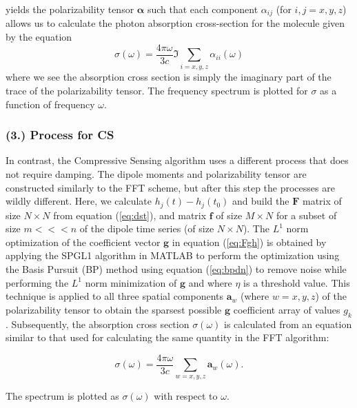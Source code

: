 \documentclass[11pt]{article}
\begin{document}
yields the polarizability tensor $\mathbf{\alpha}$ such that each component $\alpha_{ij}$ (for $i,j = x,y,z$) allows us to calculate the photon absorption cross-section for the molecule given by the equation
\begin{equation}\label{eq:fftcross}
	\sigma(\omega) = \frac{4 \pi \omega}{3c}  \Im\sum_{i = x, y, z} \alpha_{ii}(\omega)
\end{equation}
where we see the absorption cross section is simply the imaginary part of the trace of the polarizability tensor.  The frequency spectrum is plotted for $\sigma$ as a function of frequency $\omega$.

\subsubsection*{(3.)	Process for CS}	

\par In contrast, the Compressive Sensing algorithm uses a different process that does not require damping.  The dipole moments and polarizability tensor are constructed similarly to the FFT scheme, but after this step the processes are wildly different. Here, we calculate $h_{j}(t) - h_{j}(t_{0})$ and build the $\mathbf{F}$ matrix of size $N \times N$ from equation (\ref{eq:dst}), and matrix $\mathbf{f}$ of size $M \times N$  for a subset of size $m <<< n$ of the dipole time series (of size $N \times N$).  The $L^{1}$ norm optimization of the coefficient vector $\mathbf{g}$ in equation (\ref{eq:Fgh}) is obtained by applying the SPGL1 algorithm in MATLAB to perform the optimization using the Basis Pursuit (BP) method using equation (\ref{eq:bpdn}) to remove noise while performing the $L^{1}$ norm minimization of $\mathbf{g}$ and where $\eta$ is a threshold value. This technique is applied to all three spatial components $\mathbf{a}_{w}$ (where $w = x,y,z$) of the polarizability tensor to obtain the sparsest possible $\mathbf{g}$ coefficient array of values $g_{k}$.  Subsequently, the absorption cross section $\sigma(\omega)$ is calculated from an equation similar to that used for calculating the same quantity in the FFT algorithm:

\begin{equation}\label{eq:cscross}
	\sigma(\omega) = \frac{4\pi\omega}{3c}\sum_{w = x,y,z}\mathbf{a}_{w}(\omega).
\end{equation}

The spectrum is plotted as $\sigma(\omega)$ with respect to $\omega$.

\end{document}
